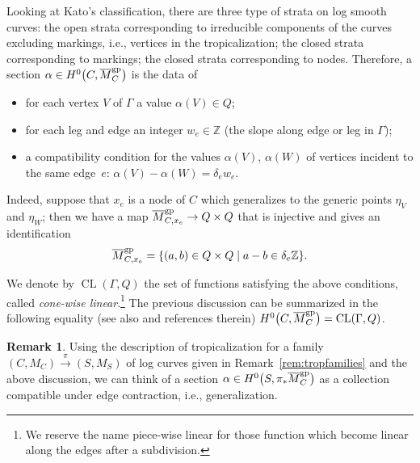 \documentclass[11pt]{article}
\numberwithin{equation}{section}
\numberwithin{equation}{section}
\theoremstyle{definition}
\newtheorem{remarkk}[theo]{Remark}
\begin{document}
Looking at Kato's classification, there are three type of strata on log smooth curves: the open strata corresponding to irreducible components of the curves excluding markings, i.e., vertices in the tropicalization; the closed strata corresponding to markings; the closed strata corresponding to nodes. Therefore, a section $\alpha\in H^0\bigl(C,\overline{M}_C^{\rm gp}\bigr)$ is the data of
\begin{itemize}\itemsep=0pt
 \item for each vertex $V$ of $\Gamma$ a value $\alpha(V)\in Q$;
 \item for each leg and edge an integer $w_e\in\mathbb Z$ (the slope along edge or leg in $\Gamma$);
 \item a compatibility condition for the values $\alpha(V)$, $\alpha(W)$ of vertices incident to the same edge~$e$: $\alpha(V)-\alpha(W)=\delta_e w_e$.
\end{itemize}
Indeed, suppose that $x_e$ is a node
of $C$ which generalizes to the generic points $\eta_V$ and $\eta_W$; then we have a map
$\overline{M}_{C,x_e}^{\rm gp}\to Q\times Q$
that is injective and gives an identification
\[\overline{M}_{C,x_e}^{\rm gp}=\{(a,b)\in Q\times Q \mid a-b\in\delta_e\mathbb Z\}.\]

We denote by $\operatorname{CL}(\Gamma,Q)$ the set of functions satisfying the above conditions, called \textit{cone-wise linear}.\footnote{We reserve the name piece-wise linear for those function which become linear along the edges after a subdivision.} The previous discussion can be summarized in the following equality (see also \cite[Section~3.3.3]{marcuswiselog} and references therein)
$H^0\bigl(C,\overline{M}_C^{\rm gp}\bigr)=\operatorname{CL}(\Gamma,Q)$.

 \begin{remarkk}
 Using the description of tropicalization for a family $(C,M_C)\xrightarrow{\pi}(S,M_S)$ of log curves given in Remark~\ref{rem:tropfamilies} and the above discussion, we can think of a section $ \alpha\in H^0\bigl(S,\pi_*\overline{M}_C^{\rm gp}\bigr)$ as a collection  compatible under edge contraction, i.e., generalization.
 \end{remarkk}
\end{document}
